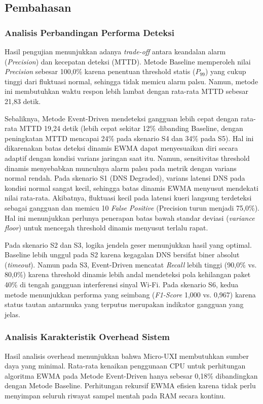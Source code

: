 \subsection{Pembahasan}

\subsubsection{Analisis Perbandingan Performa Deteksi}
Hasil pengujian menunjukkan adanya \textit{trade-off} antara keandalan alarm (\textit{Precision}) dan kecepatan deteksi (MTTD). Metode Baseline memperoleh nilai \textit{Precision} sebesar 100,0\% karena penentuan threshold statis ($P_{99}$) yang cukup tinggi dari fluktuasi normal, sehingga tidak memicu alarm palsu. Namun, metode ini membutuhkan waktu respon lebih lambat dengan rata-rata MTTD sebesar 21,83 detik.

Sebaliknya, Metode Event-Driven mendeteksi gangguan lebih cepat dengan rata-rata MTTD 19,24 detik (lebih cepat sekitar 12\% dibanding Baseline, dengan peningkatan MTTD mencapai 24\% pada skenario S4 dan 34\% pada S5). Hal ini dikarenakan batas deteksi dinamis EWMA dapat menyesuaikan diri secara adaptif dengan kondisi varians jaringan saat itu. Namun, sensitivitas threshold dinamis menyebabkan munculnya alarm palsu pada metrik dengan varians normal rendah. Pada skenario S1 (DNS Degraded), varians latensi DNS pada kondisi normal sangat kecil, sehingga batas dinamis EWMA menyusut mendekati nilai rata-rata. Akibatnya, fluktuasi kecil pada latensi kueri langsung terdeteksi sebagai gangguan dan memicu 10 \textit{False Positive} (Precision turun menjadi 75,0\%). Hal ini menunjukkan perlunya penerapan batas bawah standar deviasi (\textit{variance floor}) untuk mencegah threshold dinamis menyusut terlalu rapat.

Pada skenario S2 dan S3, logika jendela geser menunjukkan hasil yang optimal. Baseline lebih unggul pada S2 karena kegagalan DNS bersifat biner absolut (\textit{timeout}). Namun pada S3, Event-Driven mencatat \textit{Recall} lebih tinggi (90,0\% vs. 80,0\%) karena threshold dinamis lebih andal mendeteksi pola kehilangan paket 40\% di tengah gangguan interferensi sinyal Wi-Fi. Pada skenario S6, kedua metode menunjukkan performa yang seimbang (\textit{F1-Score} 1,000 vs. 0,967) karena status tautan antarmuka yang terputus merupakan indikator gangguan yang jelas.

\subsubsection{Analisis Karakteristik Overhead Sistem}
Hasil analisis overhead menunjukkan bahwa Micro-UXI membutuhkan sumber daya yang minimal. Rata-rata kenaikan penggunaan CPU untuk perhitungan algoritma EWMA pada Metode Event-Driven hanya sebesar 0,18\% dibandingkan dengan Metode Baseline. Perhitungan rekursif EWMA efisien karena tidak perlu menyimpan seluruh riwayat sampel mentah pada RAM secara kontinu. 

